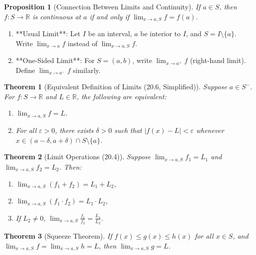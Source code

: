 \documentclass[7pt]{article}
\theoremstyle{definition}
\theoremstyle{plain}
\newtheorem{theorem}{Theorem}
\newtheorem{proposition}{Proposition}
\begin{document}
\begin{proposition}[Connection Between Limits and Continuity]
If $ a \in S $, then $ f : S \to \mathbb{R} $ is continuous at $ a $ if and only if $ \lim_{x \to a, S} f = f(a) $.
\end{proposition}

\begin{enumerate}
    \item **Usual Limit**: Let $ I $ be an interval, $ a $ be interior to $ I $, and $ S = I \setminus \{a\} $. Write $ \lim_{x \to a} f $ instead of $ \lim_{x \to a, S} f $.
    \item **One-Sided Limit**: For $ S = (a, b) $, write $ \lim_{x \to a^+} f $ (right-hand limit). Define $ \lim_{x \to a^-} f $ similarly.
\end{enumerate}

\begin{theorem}[Equivalent Definition of Limits (20.6, Simplified)]
Suppose $ a \in S^- $. For $ f : S \to \mathbb{R} $ and $ L \in \mathbb{R} $, the following are equivalent:
\begin{enumerate}
    \item $ \lim_{x \to a, S} f = L $.
    \item For all $ \varepsilon > 0 $, there exists $ \delta > 0 $ such that $ |f(x) - L| < \varepsilon $ whenever $ x \in (a - \delta, a + \delta) \cap S \setminus \{a\} $.
\end{enumerate}
\end{theorem}

\begin{theorem}[Limit Operations (20.4)]
Suppose $ \lim_{x \to a, S} f_1 = L_1 $ and $ \lim_{x \to a, S} f_2 = L_2 $. Then:
\begin{enumerate}
    \item $ \lim_{x \to a, S} (f_1 + f_2) = L_1 + L_2 $,
    \item $ \lim_{x \to a, S} (f_1 \cdot f_2) = L_1 \cdot L_2 $,
    \item If $ L_2 \neq 0 $, $ \lim_{x \to a, S} \frac{f_1}{f_2} = \frac{L_1}{L_2} $.
\end{enumerate}
\end{theorem}

\begin{theorem}[Squeeze Theorem]
If $ f(x) \leq g(x) \leq h(x) $ for all $ x \in S $, and $ \lim_{x \to a, S} f = \lim_{x \to a, S} h = L $, then $ \lim_{x \to a, S} g = L $.
\end{theorem}
\end{document}
